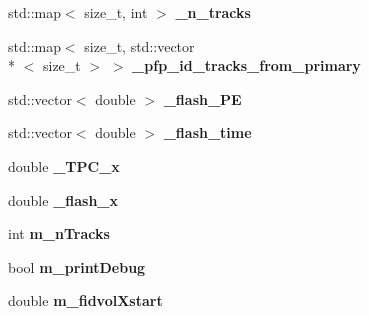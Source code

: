\begin{DoxyCompactItemize}
\item 
\hypertarget{classlee_1_1ElectronEventSelectionAlg_aed017ee63fe451fd266d9b16c9cf8d3c}{std\-::map$<$ size\-\_\-t, int $>$ {\bfseries \-\_\-n\-\_\-tracks}}\label{classlee_1_1ElectronEventSelectionAlg_aed017ee63fe451fd266d9b16c9cf8d3c}

\item 
\hypertarget{classlee_1_1ElectronEventSelectionAlg_a5f8d5c0400bf9f2a5963a70615a04f7f}{std\-::map$<$ size\-\_\-t, std\-::vector\\*
$<$ size\-\_\-t $>$ $>$ {\bfseries \-\_\-pfp\-\_\-id\-\_\-tracks\-\_\-from\-\_\-primary}}\label{classlee_1_1ElectronEventSelectionAlg_a5f8d5c0400bf9f2a5963a70615a04f7f}

\item 
\hypertarget{classlee_1_1ElectronEventSelectionAlg_ace044c6f4da66c667ce2106cb82b9851}{std\-::vector$<$ double $>$ {\bfseries \-\_\-flash\-\_\-\-P\-E}}\label{classlee_1_1ElectronEventSelectionAlg_ace044c6f4da66c667ce2106cb82b9851}

\item 
\hypertarget{classlee_1_1ElectronEventSelectionAlg_a3b833533a073320eb3142149ce708e58}{std\-::vector$<$ double $>$ {\bfseries \-\_\-flash\-\_\-time}}\label{classlee_1_1ElectronEventSelectionAlg_a3b833533a073320eb3142149ce708e58}

\item 
\hypertarget{classlee_1_1ElectronEventSelectionAlg_a8a52193b5a38db1f71b010b47f745b21}{double {\bfseries \-\_\-\-T\-P\-C\-\_\-x}}\label{classlee_1_1ElectronEventSelectionAlg_a8a52193b5a38db1f71b010b47f745b21}

\item 
\hypertarget{classlee_1_1ElectronEventSelectionAlg_a323a6efba151edcc16bf3a13d575315e}{double {\bfseries \-\_\-flash\-\_\-x}}\label{classlee_1_1ElectronEventSelectionAlg_a323a6efba151edcc16bf3a13d575315e}

\item 
\hypertarget{classlee_1_1ElectronEventSelectionAlg_a7037dd08a637555158a8575ddca0219b}{int {\bfseries m\-\_\-n\-Tracks}}\label{classlee_1_1ElectronEventSelectionAlg_a7037dd08a637555158a8575ddca0219b}

\item 
\hypertarget{classlee_1_1ElectronEventSelectionAlg_a3efb31abe249ff0a0172df48454c4a01}{bool {\bfseries m\-\_\-print\-Debug}}\label{classlee_1_1ElectronEventSelectionAlg_a3efb31abe249ff0a0172df48454c4a01}

\item 
\hypertarget{classlee_1_1ElectronEventSelectionAlg_a2bc56efdd67fed68ea859f9c31e92689}{double {\bfseries m\-\_\-fidvol\-Xstart}}\label{classlee_1_1ElectronEventSelectionAlg_a2bc56efdd67fed68ea859f9c31e92689}


\end{DoxyCompactItemize}
